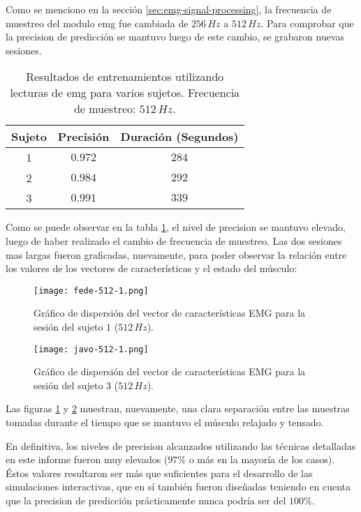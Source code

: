 Como se menciono en la sección \ref{sec:emg-signal-processing}, la frecuencia de muestreo del modulo \acrshort{emg} fue cambiada de $256\,Hz$ a $512\,Hz$. Para comprobar que la precision de predicción se mantuvo luego de este cambio, se grabaron nuevas sesiones.

\begin{table}[H]
\centering
\begin{tabular}{ |c|c|c| } 
 \hline
 Sujeto & Precisión & Duración (Segundos) \\ 
 \hline
 1 & $0.972$ & $284$ \\
 \hline
 2 & $0.984$ & $292$ \\
 \hline
 3 & $0.991$ & $339$ \\

 \hline
\end{tabular}
\caption{Resultados de entrenamientos utilizando lecturas de \acrshort{emg} para varios sujetos. Frecuencia de muestreo: $512\,Hz$.}
\label{tab:emg-results-512}
\end{table}
	
Como se puede observar en la tabla \ref{tab:emg-results-512}, el nivel de precision se mantuvo elevado, luego de haber realizado el cambio de frecuencia de muestreo. Las dos sesiones mas largas fueron graficadas, nuevamente, para poder observar la relación entre los valores de los vectores de características y el estado del músculo:

\begin{figure}[H]
	\centering
    \texttt{[image: fede-512-1.png]}
    \caption{Gráfico de dispersión del vector de características EMG para la sesión del sujeto $1$ ($512\,Hz$).}
	\label{fig:emg-graph-s1-512}
\end{figure}

\begin{figure}[H]
	\centering
    \texttt{[image: javo-512-1.png]}
    \caption{Gráfico de dispersión del vector de características EMG para la sesión del sujeto $3$ ($512\,Hz$).}
	\label{fig:emg-graph-s3-512}
\end{figure}

Las figuras \ref{fig:emg-graph-s1-512} y \ref{fig:emg-graph-s3-512} muestran, nuevamente, una clara separación entre las muestras tomadas durante el tiempo que se mantuvo el músculo relajado y tensado.

En definitiva, los niveles de precision alcanzados utilizando las técnicas detalladas en este informe fueron muy elevados ($97\%$ o más en la mayoría de los casos). Éstos valores resultaron ser más que suficientes para el desarrollo de las simulaciones interactivas, que en sí también fueron diseñadas teniendo en cuenta que la precision de predicción prácticamente nunca podría ser del $100\%$.

